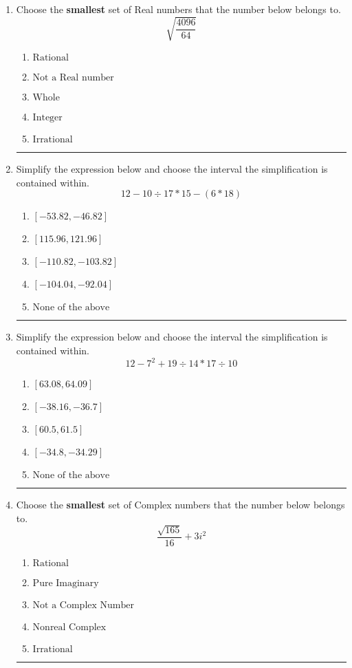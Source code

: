 \documentclass[14pt]{extbook}
\newcommand{\litem}[1]{\item#1\hspace*{-1cm}\rule{\textwidth}{0.4pt}}
\begin{document}
\begin{enumerate}
\litem{
Choose the \textbf{smallest} set of Real numbers that the number below belongs to.\[ \sqrt{\frac{4096}{64}} \]\begin{enumerate}[label=\Alph*.]
\item \( \text{Rational} \)
\item \( \text{Not a Real number} \)
\item \( \text{Whole} \)
\item \( \text{Integer} \)
\item \( \text{Irrational} \)

\end{enumerate} }
\litem{
Simplify the expression below and choose the interval the simplification is contained within.\[ 12 - 10 \div 17 * 15 - (6 * 18) \]\begin{enumerate}[label=\Alph*.]
\item \( [-53.82, -46.82] \)
\item \( [115.96, 121.96] \)
\item \( [-110.82, -103.82] \)
\item \( [-104.04, -92.04] \)
\item \( \text{None of the above} \)

\end{enumerate} }
\litem{
Simplify the expression below and choose the interval the simplification is contained within.\[ 12 - 7^2 + 19 \div 14 * 17 \div 10 \]\begin{enumerate}[label=\Alph*.]
\item \( [63.08, 64.09] \)
\item \( [-38.16, -36.7] \)
\item \( [60.5, 61.5] \)
\item \( [-34.8, -34.29] \)
\item \( \text{None of the above} \)

\end{enumerate} }
\litem{
Choose the \textbf{smallest} set of Complex numbers that the number below belongs to.\[ \frac{\sqrt{165}}{16}+3i^2 \]\begin{enumerate}[label=\Alph*.]
\item \( \text{Rational} \)
\item \( \text{Pure Imaginary} \)
\item \( \text{Not a Complex Number} \)
\item \( \text{Nonreal Complex} \)
\item \( \text{Irrational} \)


\end{enumerate}}
\end{enumerate}
\end{document}
